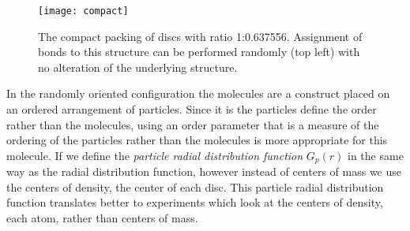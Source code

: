 \begin{figure}
    \centering
    \texttt{[image: compact]}
    \caption{The compact packing of discs with ratio 1:0.637556. Assignment of bonds to this structure can be performed randomly (top left) with no alteration of the underlying structure.}
    \label{fig:compact}
\end{figure}

In the randomly oriented configuration the molecules are a construct placed on an ordered arrangement of particles. Since it is the particles define the order rather than the molecules, using an order parameter that is a measure of the ordering of the particles rather than the molecules is more appropriate for this molecule. If we define the \emph{particle radial distribution function} $G_p(r)$ in the same way as the radial distribution function, however instead of centers of mass we use the centers of density, the center of each disc. This particle radial distribution function translates better to experiments which look at the centers of density, each atom, rather than centers of mass. 

